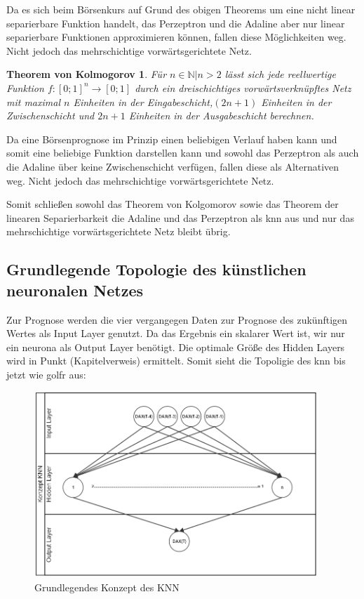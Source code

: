 Da es sich beim Börsenkurs auf Grund des obigen Theorems um eine nicht linear separierbare Funktion handelt, das Perzeptron und die Adaline aber nur linear separierbare Funktionen approximieren können, fallen diese Möglichkeiten weg. Nicht jedoch das mehrschichtige vorwärtsgerichtete Netz.


\newtheorem*{theorem1*}{Theorem von Kolmogorov}
\begin{theorem1*}
Für ${n \in \mathbb{N} | n>2}$ lässt sich jede reellwertige Funktion $f:[0;1]^n\rightarrow[0;1]$ durch ein dreischichtiges vorwärtsverknüpftes Netz mit maximal $n$ Einheiten in der Eingabeschicht,$(2n+1)$ Einheiten in der Zwischenschicht und $2n+1$ Einheiten in der Ausgabeschicht berechnen.
\end{theorem1*}

Da eine Börsenprognose im Prinzip einen beliebigen Verlauf haben kann und somit eine beliebige Funktion darstellen kann und  sowohl das Perzeptron als auch die Adaline über keine Zwischenschicht verfügen, fallen diese als Alternativen weg. Nicht jedoch das mehrschichtige vorwärtsgerichtete Netz.

Somit schließen sowohl das Theorem von Kolgomorov sowie das Theorem der linearen Separierbarkeit die Adaline und das Perzeptron als \ac{knn} aus und nur das mehrschichtige vorwärtsgerichtete Netz bleibt übrig.


\subsection{Grundlegende Topologie des künstlichen neuronalen Netzes}
\label{subsection:Grundlegende Topologie des künstlichen neuronalen Netzes}

Zur Prognose werden die vier vergangegen Daten zur Prognose des zukünftigen Wertes als Input Layer genutzt. Da das Ergebnis ein skalarer Wert ist, wir nur ein neurona als Output Layer benötigt. Die optimale Größe des Hidden Layers wird in Punkt (Kapitelverweis) ermittelt. Somit sieht die Topoligie des knn bis jetzt wie golfr aus:

\begin{figure}[H]
\centering
		\includegraphics[width=0.95\textwidth]{KonzeptKNN.PNG}
	\caption{Grundlegendes Konzept des KNN}
	\label{fig:Grundlegendes Konzept des KNN}
\end{figure}

